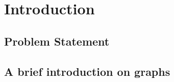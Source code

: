 \chapter{Introduction}\label{ch:introduction}

\section{Problem Statement}\label{sec:problem-statement}


\section{A brief introduction on graphs}\label{sec:graph-intro}


